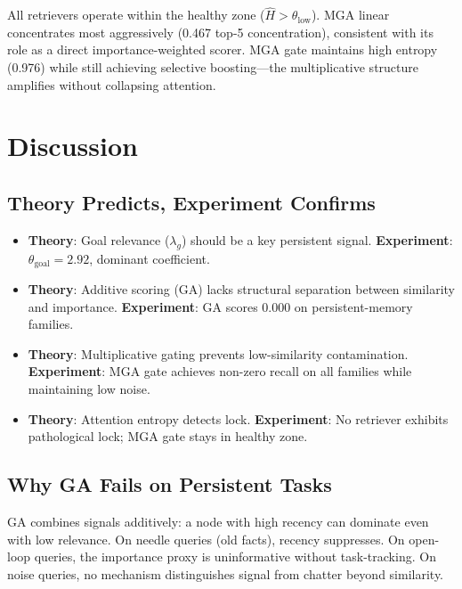 \documentclass{article}
\begin{document}
All retrievers operate within the healthy zone ($\hat{H} > \theta_{\text{low}}$). MGA linear concentrates most aggressively (0.467 top-5 concentration), consistent with its role as a direct importance-weighted scorer. MGA gate maintains high entropy (0.976) while still achieving selective boosting---the multiplicative structure amplifies without collapsing attention.

\section{Discussion}

\subsection{Theory Predicts, Experiment Confirms}

\begin{itemize}[leftmargin=2em,itemsep=2pt]
\item \textbf{Theory}: Goal relevance ($\lambda_g$) should be a key persistent signal. \textbf{Experiment}: $\theta_{\text{goal}} = 2.92$, dominant coefficient.
\item \textbf{Theory}: Additive scoring (GA) lacks structural separation between similarity and importance. \textbf{Experiment}: GA scores 0.000 on persistent-memory families.
\item \textbf{Theory}: Multiplicative gating prevents low-similarity contamination. \textbf{Experiment}: MGA gate achieves non-zero recall on all families while maintaining low noise.
\item \textbf{Theory}: Attention entropy detects lock. \textbf{Experiment}: No retriever exhibits pathological lock; MGA gate stays in healthy zone.
\end{itemize}

\subsection{Why GA Fails on Persistent Tasks}

GA combines signals additively: a node with high recency can dominate even with low relevance. On needle queries (old facts), recency suppresses. On open-loop queries, the importance proxy is uninformative without task-tracking. On noise queries, no mechanism distinguishes signal from chatter beyond similarity.
\end{document}
